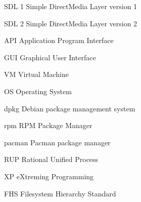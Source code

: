 \begin{siglas}
  \item[SDL 1] Simple DirectMedia Layer version 1
  \item[SDL 2] Simple DirectMedia Layer version 2
  \item[API] Application Program Interface
  \item[GUI] Graphical User Interface
  \item[VM] Virtual Machine
  \item[OS] Operating System
  \item[dpkg] Debian package management system
  \item[rpm] RPM Package Manager
  \item[pacman] Pacman package manager
  \item[RUP] Rational Unified Process
  \item[XP] eXtreming Programming
  \item[FHS] Filesystem Hierarchy Standard
\end{siglas}
